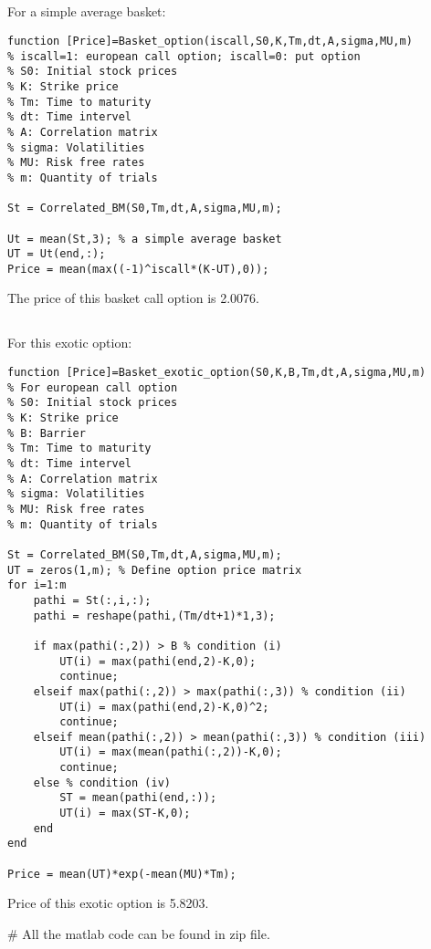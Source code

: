 \documentclass{article}
\begin{document}
\subsection{}

For a simple average basket:
\begin{verbatim}
function [Price]=Basket_option(iscall,S0,K,Tm,dt,A,sigma,MU,m)
% iscall=1: european call option; iscall=0: put option
% S0: Initial stock prices
% K: Strike price
% Tm: Time to maturity
% dt: Time intervel
% A: Correlation matrix
% sigma: Volatilities
% MU: Risk free rates
% m: Quantity of trials

St = Correlated_BM(S0,Tm,dt,A,sigma,MU,m);

Ut = mean(St,3); % a simple average basket
UT = Ut(end,:);
Price = mean(max((-1)^iscall*(K-UT),0));
\end{verbatim}

The price of this basket call option is 2.0076.

\subsection{}

For this exotic option:
\begin{verbatim}
function [Price]=Basket_exotic_option(S0,K,B,Tm,dt,A,sigma,MU,m)
% For european call option
% S0: Initial stock prices
% K: Strike price
% B: Barrier
% Tm: Time to maturity
% dt: Time intervel
% A: Correlation matrix
% sigma: Volatilities
% MU: Risk free rates
% m: Quantity of trials

St = Correlated_BM(S0,Tm,dt,A,sigma,MU,m);
UT = zeros(1,m); % Define option price matrix
for i=1:m
    pathi = St(:,i,:);
    pathi = reshape(pathi,(Tm/dt+1)*1,3);
    
    if max(pathi(:,2)) > B % condition (i)
        UT(i) = max(pathi(end,2)-K,0);
        continue;
    elseif max(pathi(:,2)) > max(pathi(:,3)) % condition (ii)
        UT(i) = max(pathi(end,2)-K,0)^2;
        continue;
    elseif mean(pathi(:,2)) > mean(pathi(:,3)) % condition (iii)
        UT(i) = max(mean(pathi(:,2))-K,0);
        continue;
    else % condition (iv)
        ST = mean(pathi(end,:));
        UT(i) = max(ST-K,0);
    end
end

Price = mean(UT)*exp(-mean(MU)*Tm);
\end{verbatim}

Price of this exotic option is 5.8203.



\# All the matlab code can be found in zip file.


\end{document}
